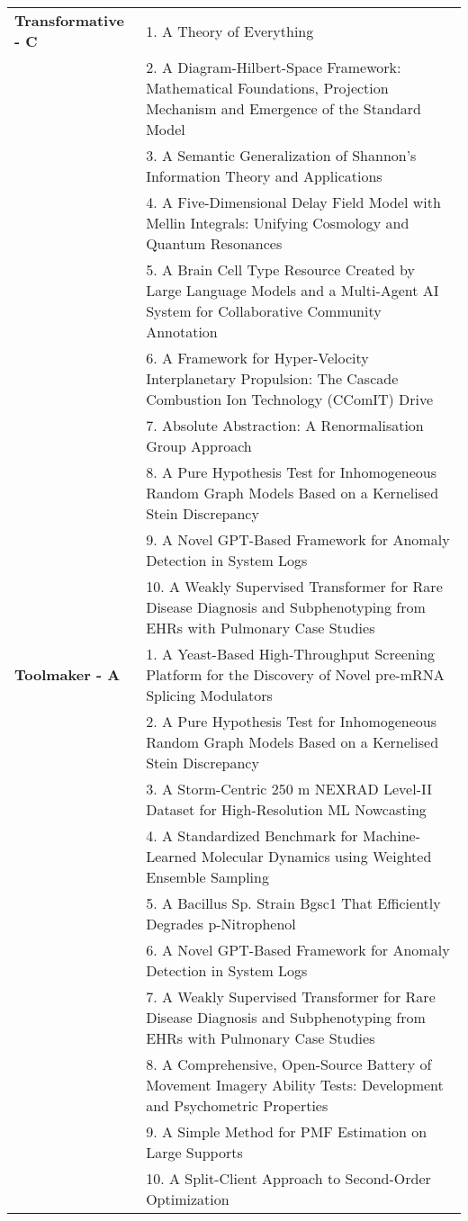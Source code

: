 \documentclass{article}
\begin{document}
\begin{longtable}{p{2.5cm}p{13cm}}
\textbf{Transformative - C} & 1. A Theory of Everything \\
& 2. A Diagram-Hilbert-Space Framework: Mathematical Foundations, Projection Mechanism and Emergence of the Standard Model \\
& 3. A Semantic Generalization of Shannon's Information Theory and Applications \\
& 4. A Five-Dimensional Delay Field Model with Mellin Integrals: Unifying Cosmology and Quantum Resonances \\
& 5. A Brain Cell Type Resource Created by Large Language Models and a Multi-Agent AI System for Collaborative Community Annotation \\
& 6. A Framework for Hyper-Velocity Interplanetary Propulsion: The Cascade Combustion Ion Technology (CComIT) Drive \\
& 7. Absolute Abstraction: A Renormalisation Group Approach \\
& 8. A Pure Hypothesis Test for Inhomogeneous Random Graph Models Based on a Kernelised Stein Discrepancy \\
& 9. A Novel GPT-Based Framework for Anomaly Detection in System Logs \\
& 10. A Weakly Supervised Transformer for Rare Disease Diagnosis and Subphenotyping from EHRs with Pulmonary Case Studies \\
\midrule

\textbf{Toolmaker - A} & 1. A Yeast-Based High-Throughput Screening Platform for the Discovery of Novel pre-mRNA Splicing Modulators \\
& 2. A Pure Hypothesis Test for Inhomogeneous Random Graph Models Based on a Kernelised Stein Discrepancy \\
& 3. A Storm-Centric 250 m NEXRAD Level-II Dataset for High-Resolution ML Nowcasting \\
& 4. A Standardized Benchmark for Machine-Learned Molecular Dynamics using Weighted Ensemble Sampling \\
& 5. A Bacillus Sp. Strain Bgsc1 That Efficiently Degrades p-Nitrophenol \\
& 6. A Novel GPT-Based Framework for Anomaly Detection in System Logs \\
& 7. A Weakly Supervised Transformer for Rare Disease Diagnosis and Subphenotyping from EHRs with Pulmonary Case Studies \\
& 8. A Comprehensive, Open-Source Battery of Movement Imagery Ability Tests: Development and Psychometric Properties \\
& 9. A Simple Method for PMF Estimation on Large Supports \\
& 10. A Split-Client Approach to Second-Order Optimization \\
\midrule


\end{longtable}
\end{document}
